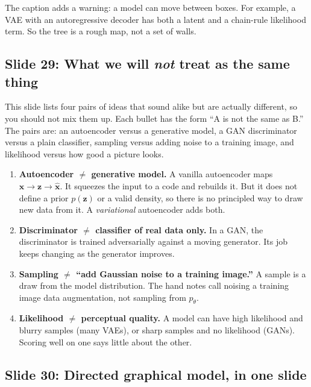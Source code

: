 The caption adds a warning: a model can move between boxes. For example, a VAE with an autoregressive decoder has both a latent and a chain-rule likelihood term. So the tree is a rough map, not a set of walls.

\subsection*{Slide 29: What we will \textit{not} treat as the same thing}

This slide lists four pairs of ideas that sound alike but are actually different, so you should not mix them up. Each bullet has the form ``A is not the same as B.'' The pairs are: an autoencoder versus a generative model, a GAN discriminator versus a plain classifier, sampling versus adding noise to a training image, and likelihood versus how good a picture looks.
\begin{enumerate}
\item \textbf{Autoencoder $\neq$ generative model.} A vanilla autoencoder maps $\mathbf{x}\to\mathbf{z}\to\hat{\mathbf{x}}$. It squeezes the input to a code and rebuilds it. But it does not define a prior $p(\mathbf{z})$ or a valid density, so there is no principled way to draw new data from it. A \textit{variational} autoencoder adds both.
\item \textbf{Discriminator $\neq$ classifier of real data only.} In a GAN, the discriminator is trained adversarially against a moving generator. Its job keeps changing as the generator improves.
\item \textbf{Sampling $\neq$ ``add Gaussian noise to a training image.''} A sample is a draw from the model distribution. The hand notes call noising a training image data augmentation, not sampling from $p_\theta$.
\item \textbf{Likelihood $\neq$ perceptual quality.} A model can have high likelihood and blurry samples (many VAEs), or sharp samples and no likelihood (GANs). Scoring well on one says little about the other.
\end{enumerate}

\subsection*{Slide 30: Directed graphical model, in one slide}

